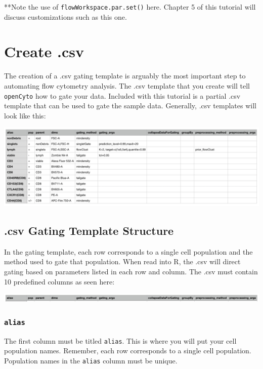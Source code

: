 \documentclass[]{book}
\begin{document}
**Note the use of \texttt{flowWorkspace.par.set()} here. Chapter 5 of this tutorial will discuss customizations such as this one.

\hypertarget{create-.csv}{%
\chapter{Create .csv}\label{create-.csv}}

The creation of a .csv gating template is arguably the most important step to automating flow cytometry analysis. The .csv template that you create will tell \texttt{openCyto} how to gate your data. Included with this tutorial is a partial .csv template that can be used to gate the sample data. Generally, .csv templates will look like this:

\includegraphics[width=0.6\linewidth]{./tutorial/images/entire_csv}

\hypertarget{csv-gating-template-structure}{%
\section{.csv Gating Template Structure}\label{csv-gating-template-structure}}

In the gating template, each row corresponds to a single cell population and the method used to gate that population. When read into R, the .csv will direct gating based on parameters listed in each row and column. The .csv must contain 10 predefined columns as seen here:

\includegraphics[width=0.6\linewidth]{./tutorial/images/cols}

\hypertarget{alias}{%
\subsection{\texorpdfstring{\texttt{alias}}{alias}}\label{alias}}

The first column must be titled \texttt{alias}. This is where you will put your cell population names. Remember, each row corresponds to a single cell population. Population names in the \texttt{alias} column must be unique.
\end{document}
